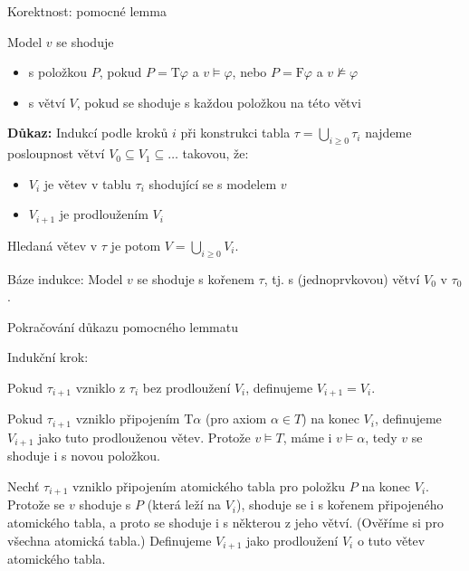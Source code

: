 \documentclass{beamer}
\begin{document}
\begin{frame}{Korektnost: pomocné lemma}


    Model $v$ se \alert{shoduje}\pause
    \begin{itemize}
        \item \alert{s položkou $P$}, pokud
        $P=\mathrm{T}\varphi$ a $v\models\varphi$, nebo $P=\mathrm{F}\varphi$ a $v\not\models\varphi$\pause
        \item \alert{s větví $V$}, pokud se shoduje s každou položkou na této větvi
    \end{itemize}
    
    \medskip

    \pause

    \smallskip
    
    \pause
    \textbf{Důkaz:}
    Indukcí podle kroků $i$ při konstrukci tabla $\tau=\bigcup_{i\geq 0}\tau_i$ najdeme posloupnost větví $V_0\subseteq V_1\subseteq\dots$ takovou, že:\pause
     \begin{itemize}
        \item $V_i$ je větev v tablu $\tau_i$ shodující se s modelem $v$\pause
        \item $V_{i+1}$ je prodloužením $V_i$\pause
     \end{itemize}

    Hledaná větev v $\tau$ je potom $V=\bigcup_{i\geq 0}V_i$.\pause
    
    \alert{Báze indukce:} Model $v$ se shoduje s kořenem $\tau$, tj. s (jednoprvkovou) větví $V_0$ v $\tau_0$.

\end{frame}


\begin{frame}{Pokračování důkazu pomocného lemmatu}

    \alert{Indukční krok:}
    
    \pause
    Pokud $\tau_{i+1}$ vzniklo z $\tau_i$ bez prodloužení $V_i$, definujeme $V_{i+1}=V_i$.

    \medskip

    \pause
    Pokud $\tau_{i+1}$ vzniklo připojením $\mathrm{T}\alpha$ (pro axiom $\alpha\in T$) na konec $V_i$, definujeme $V_{i+1}$ jako tuto prodlouženou větev. \pause
    Protože $v\models T$, máme i $v\models\alpha$, tedy $v$ se shoduje i s novou položkou.
    
    \medskip

    \pause
    Nechť $\tau_{i+1}$ vzniklo připojením atomického tabla pro položku $P$ na konec $V_i$. \pause
    Protože se $v$ shoduje s $P$ (která leží na $V_i$), shoduje se i s kořenem připojeného atomického tabla, a proto se shoduje i s některou z jeho větví. \pause
    (Ověříme si pro všechna atomická tabla.) \pause
    Definujeme $V_{i+1}$ jako prodloužení $V_i$ o tuto větev atomického tabla.\hfill\qedsymbol

\end{frame}
\end{document}
